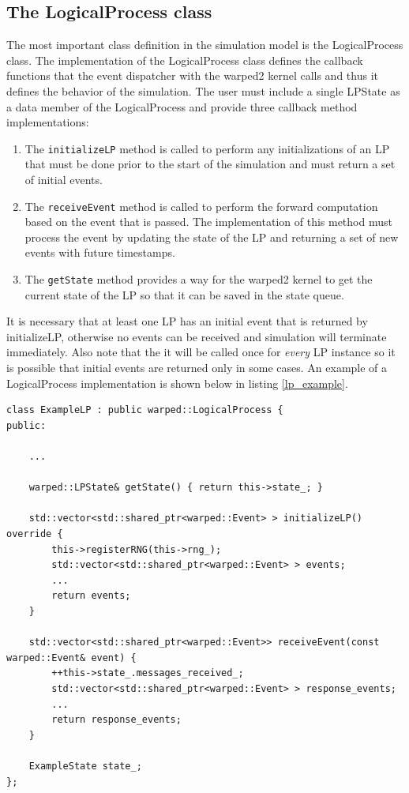 \documentclass[11pt]{book}
\begin{document}
\subsection{The LogicalProcess class}

The most important class definition in the simulation model is the LogicalProcess class.
The implementation of the LogicalProcess class defines the callback functions that the
event dispatcher with the warped2 kernel calls and thus it defines the behavior of the simulation.
The user must include a single LPState as a data member of the LogicalProcess and provide three
callback method implementations:

\begin{enumerate}
    \item The \texttt{initializeLP} method is called to perform any initializations of an LP that
        must be done prior to the start of the simulation and must return a set of initial events.
    \item The \texttt{receiveEvent} method is called to perform the forward computation based on
        the event that is passed. The implementation of this method must process the event by
        updating the state of the LP and returning a set of new events with future timestamps.
    \item The \texttt{getState} method provides a way for the warped2 kernel to get the current
        state of the LP so that it can be saved in the state queue.
\end{enumerate}

It is necessary that at least one LP has an initial event that is returned by initializeLP,
otherwise no events can be received and simulation will terminate immediately. Also note that
the it will be called once for \emph{every} LP instance so it is possible that initial events
are returned only in some cases. An example of a LogicalProcess implementation is shown below
in listing \ref{lp_example}.

\begin{lstlisting}[caption=Example \textsc{warped2} LogicalProcess Definition, label=lp_example, float]
class ExampleLP : public warped::LogicalProcess {
public:

    ...

    warped::LPState& getState() { return this->state_; }

    std::vector<std::shared_ptr<warped::Event> > initializeLP() override {
        this->registerRNG(this->rng_);
        std::vector<std::shared_ptr<warped::Event> > events;
        ...
        return events;
    }

    std::vector<std::shared_ptr<warped::Event>> receiveEvent(const warped::Event& event) {
        ++this->state_.messages_received_;
        std::vector<std::shared_ptr<warped::Event> > response_events;
        ...
        return response_events;
    }

    ExampleState state_;
};
\end{lstlisting}
\end{document}
